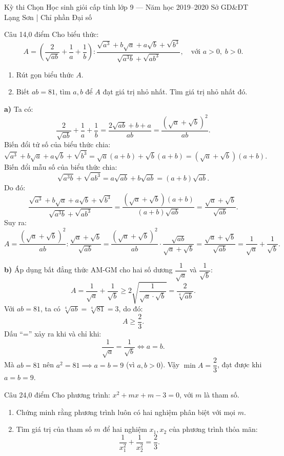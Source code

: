 ﻿%
%
  {Kỳ thi Chọn Học sinh giỏi cấp tỉnh lớp 9 — Năm học 2019--2020}%
  {Sở GD\&ĐT Lạng Sơn | Chỉ phần Đại số}

\begin{de_cau}{Câu 1}{4,0 điểm}
Cho biểu thức:
\[A = \left(\dfrac{2}{\sqrt{ab}} + \dfrac{1}{a} + \dfrac{1}{b}\right) : \dfrac{\sqrt{a^3} + b\sqrt{a} + a\sqrt{b} + \sqrt{b^3}}{\sqrt{a^3b} + \sqrt{ab^3}},\quad \text{với } a > 0,\; b > 0.\]
\begin{enumerate}[label=\alph*)]
\item Rút gọn biểu thức $A$.
\item Biết $ab = 81$, tìm $a, b$ để $A$ đạt giá trị nhỏ nhất. Tìm giá trị nhỏ nhất đó.
\end{enumerate}
\end{de_cau}

\begin{loi_giai_cau}
\textbf{a)} Ta có:
\[\frac{2}{\sqrt{ab}} + \frac{1}{a} + \frac{1}{b} = \frac{2\sqrt{ab} + b + a}{ab} = \frac{(\sqrt{a}+\sqrt{b})^2}{ab}.\]
Biến đổi tử số của biểu thức chia:
\[\sqrt{a^3} + b\sqrt{a} + a\sqrt{b} + \sqrt{b^3} = \sqrt{a}(a+b) + \sqrt{b}(a+b) = (\sqrt{a}+\sqrt{b})(a+b).\]
Biến đổi mẫu số của biểu thức chia:
\[\sqrt{a^3b} + \sqrt{ab^3} = a\sqrt{ab} + b\sqrt{ab} = (a+b)\sqrt{ab}.\]
Do đó:
\[\frac{\sqrt{a^3} + b\sqrt{a} + a\sqrt{b} + \sqrt{b^3}}{\sqrt{a^3b} + \sqrt{ab^3}} = \frac{(\sqrt{a}+\sqrt{b})(a+b)}{(a+b)\sqrt{ab}} = \frac{\sqrt{a}+\sqrt{b}}{\sqrt{ab}}.\]
Suy ra:
\[A = \frac{(\sqrt{a}+\sqrt{b})^2}{ab} : \frac{\sqrt{a}+\sqrt{b}}{\sqrt{ab}} = \frac{(\sqrt{a}+\sqrt{b})^2}{ab} \cdot \frac{\sqrt{ab}}{\sqrt{a}+\sqrt{b}} = \boxed{\frac{\sqrt{a}+\sqrt{b}}{\sqrt{ab}} = \frac{1}{\sqrt{a}} + \frac{1}{\sqrt{b}}}.\]

\textbf{b)} Áp dụng bất đẳng thức AM-GM cho hai số dương $\dfrac{1}{\sqrt{a}}$ và $\dfrac{1}{\sqrt{b}}$:
\[A = \frac{1}{\sqrt{a}} + \frac{1}{\sqrt{b}} \ge 2\sqrt{\frac{1}{\sqrt{a}\cdot\sqrt{b}}} = \frac{2}{\sqrt[4]{ab}}.\]
Với $ab = 81$, ta có $\sqrt[4]{ab} = \sqrt[4]{81} = 3$, do đó:
\[A \ge \frac{2}{3}.\]
Dấu ``='' xảy ra khi và chỉ khi:
\[\frac{1}{\sqrt{a}} = \frac{1}{\sqrt{b}} \iff a = b.\]
Mà $ab = 81$ nên $a^2 = 81 \implies a = b = 9$ (vì $a, b > 0$).
Vậy $\min A = \boxed{\dfrac{2}{3}}$, đạt được khi $\boxed{a = b = 9}$.
\end{loi_giai_cau}

\begin{de_cau}{Câu 2}{4,0 điểm}
Cho phương trình: $x^2 + mx + m - 3 = 0$, với $m$ là tham số.
\begin{enumerate}[label=\alph*)]
\item Chứng minh rằng phương trình luôn có hai nghiệm phân biệt với mọi $m$.
\item Tìm giá trị của tham số $m$ để hai nghiệm $x_1, x_2$ của phương trình thỏa mãn:
\[\dfrac{1}{x_1^2} + \dfrac{1}{x_2^2} = \dfrac{2}{3}.\]
\end{enumerate}
\end{de_cau}

